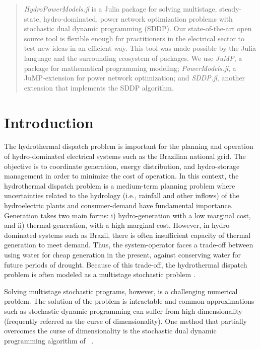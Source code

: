 \documentclass{juliacon}
\begin{document}


\maketitle

\begin{abstract}

\textit{HydroPowerModels.jl} is a Julia package for solving multistage, steady-state, hydro-dominated, power network optimization problems with stochastic dual dynamic programming (SDDP). Our state-of-the-art open source tool is flexible enough for practitioners in the electrical sector to test new ideas in an efficient way. This tool was made possible by the Julia language and the surrounding ecosystem of packages. We use \textit{JuMP}, a package for mathematical programming modeling; \textit{PowerModels.jl}, a JuMP-extension for power network optimization; and \textit{SDDP.jl}, another extension that implements the SDDP algorithm.

\end{abstract}

\section{Introduction}

The hydrothermal dispatch problem is important for the planning and operation of hydro-dominated electrical systems such as the Brazilian national grid. The objective is to coordinate generation, energy distribution, and hydro-storage management in order to minimize the cost of operation. In this context, the hydrothermal dispatch problem is a medium-term planning problem where uncertainties related to the hydrology (i.e., rainfall and other inflows) of the hydroelectric plants and consumer-demand have fundamental importance. Generation takes two main forms: i) hydro-generation with a low marginal cost, and ii) thermal-generation, with a high marginal cost. However, in hydro-dominated systems such as Brazil, there is often insufficient capacity of thermal generation to meet demand. Thus, the system-operator faces a trade-off between using water for cheap generation in the present, against conserving water for future periods of drought. Because of this trade-off, the hydrothermal dispatch problem is often modeled as a multistage stochastic problem \cite{pereira1991multi,maceiral2018twenty,terlaky_marginal_2017}.

Solving multistage stochastic programs, however, is a challenging numerical problem. The solution of the problem is intractable and common approximations such as stochastic dynamic programming \cite{bellman1966dynamic} \cite{bertsekas1995dynamic} can suffer from high dimensionality (frequently referred as the curse of dimensionality). One method that partially overcomes the curse of dimensionality is the stochastic dual dynamic programming algorithm of ~\cite{pereira1991multi}.
\end{document}
